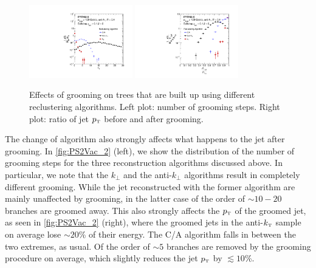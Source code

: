\begin{figure}[t!]
\centering
\includegraphics[width=0.4\textwidth]{figures/SDAlgorithms/ndropClusteringComp.pdf}%
\includegraphics[width=0.4\textwidth]{figures/SDAlgorithms/ptratioClusteringComp.pdf}%
\caption{Effects of grooming on trees that are built up using different reclustering algorithms. Left plot: number of grooming steps. Right plot: ratio of jet $p_{\text{\tiny T}}$ before and after grooming.
}
\label{fig:PS2Vac_2}
\end{figure}
The change of algorithm also strongly affects what happens to the jet after grooming. In \autoref{fig:PS2Vac_2} (left), we show the distribution of the number of grooming steps for the three reconstruction algorithms discussed above. In particular, we note that the $k_\perp$ and the anti-$k_\perp$ algorithms result in completely different grooming. While the jet reconstructed with the former algorithm are mainly unaffected by grooming, in the latter case of the order of $\sim 10-20$ branches are groomed away. This also strongly affects the $p_{\text{\tiny T}}$ of the groomed jet, as seen in \autoref{fig:PS2Vac_2} (right), where the groomed jets in the anti-$k_{\text{\tiny T}}$ sample on average lose $\sim 20$\% of their energy. The C/A algorithm falls in between the two extremes, as usual. Of the order of $\sim 5$ branches are removed by the grooming procedure on average, which slightly reduces the jet $p_{\text{\tiny T}}$ by $\lesssim 10$\%.

